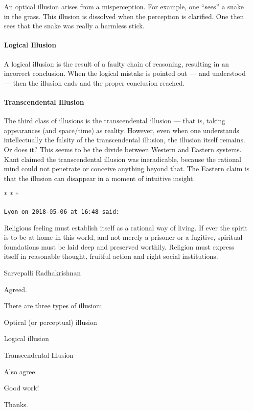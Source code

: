 An optical illusion arises from a misperception. For example, one ``sees'' a snake in the grass. This illusion is dissolved when the perception is clarified. One then sees that the snake was really a harmless stick.

\paragraph{Logical Illusion}


A logical illusion is the result of a faulty chain of reasoning, resulting in an incorrect conclusion. When the logical mistake is pointed out --- and understood --- then the illusion ends and the proper conclusion reached.

\paragraph{Transcendental Illusion}


The third class of illusions is the transcendental illusion --- that is, taking appearances (and space/time) as reality. However, even when one understands intellectually the falsity of the transcendental illusion, the illusion itself remains. Or does it? This seems to be the divide between Western and Eastern systems. Kant claimed the transcendental illusion was ineradicable, because the rational mind could not penetrate or conceive anything beyond that. The Eastern claim is that the illusion can disappear in a moment of intuitive insight.



\begin{center}* * *\end{center}

\begin{footnotesize}
\begin{sffamily}
\texttt{Lyon on 2018-05-06 at 16:48 said:}

Religious feeling must establish itself as a rational way of living. If ever the spirit is to be at home in this world, and not merely a prisoner or a fugitive, spiritual foundations must be laid deep and preserved worthily. Religion must express itself in reasonable thought, fruitful action and right social institutions.

Sarvepalli Radhakrishnan


Agreed.

There are three types of illusion:

Optical (or perceptual) illusion

Logical illusion

Transcendental Illusion

Also agree.

Good work!

Thanks.


\hfill

\end{sffamily}
\end{footnotesize}

